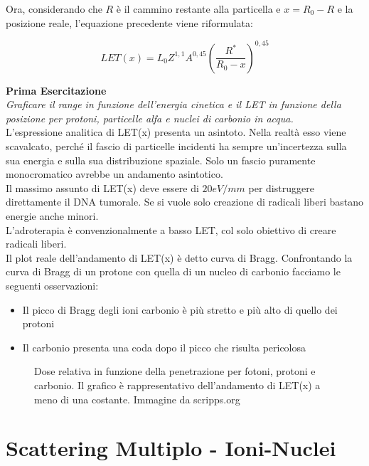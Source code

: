 \documentclass [a4paper, twoside] {book}
\begin{document}
Ora, considerando che $R$ è il cammino restante alla particella e $x=R_0-R$ e la posizione reale, l'equazione precedente viene riformulata:

\begin{equation}
LET(x)=L_0Z^{1,1}A^{0,45}(\frac{R^*}{R_0-x})^{0,45}
\end{equation}

\textbf{Prima Esercitazione}\\
\emph{Graficare il range in funzione dell'energia cinetica e il LET in funzione della posizione per protoni, particelle alfa e nuclei di carbonio in acqua.}\\

L'espressione analitica di LET(x) presenta un asintoto. Nella realtà esso viene scavalcato, perché il fascio di particelle incidenti ha sempre un'incertezza sulla sua energia e sulla sua distribuzione spaziale. Solo un fascio puramente monocromatico avrebbe un andamento asintotico. \\

Il massimo assunto di LET(x) deve essere di $20 eV/mm$ per distruggere direttamente il DNA tumorale. Se si vuole solo creazione di radicali liberi bastano energie anche minori.\\

L'adroterapia è convenzionalmente a basso LET, col solo obiettivo di creare radicali liberi. \\

Il plot reale dell'andamento di LET(x) è detto curva di Bragg. Confrontando la curva di Bragg di un protone con quella di un nucleo di carbonio facciamo le seguenti osservazioni:

\begin{itemize}
\item Il picco di Bragg degli ioni carbonio è più stretto e più alto di quello dei protoni
\item Il carbonio presenta una coda dopo il picco che risulta pericolosa
\end{itemize}

\begin{figure}[]
\centering
	\caption{Dose relativa in funzione della penetrazione per fotoni, protoni e carbonio. Il grafico è rappresentativo dell'andamento di LET(x) a meno di una costante. Immagine da scripps.org}
	\label{fig:bragg}
\end{figure}


\section{Scattering Multiplo - Ioni-Nuclei}
\end{document}

